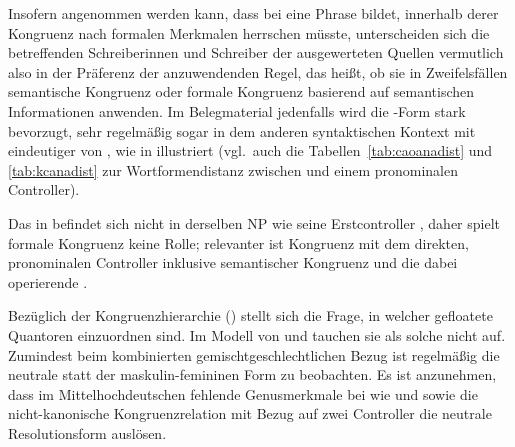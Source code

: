 Insofern angenommen werden kann, dass  bei 
eine Phrase bildet, innerhalb derer Kongruenz nach formalen
Merkmalen herrschen müsste, unterscheiden sich die
betreffenden Schreiberinnen und Schreiber der ausgewerteten Quellen vermutlich
also in der Präferenz der anzuwendenden Regel, das heißt, ob sie in
Zweifelsfällen semantische Kongruenz oder formale
Kongruenz basierend auf semantischen Informationen anwenden. Im Belegmaterial
jedenfalls wird die -Form stark bevorzugt, sehr regelmäßig sogar in
dem anderen syntaktischen Kontext mit eindeutiger  von
, wie in 
illustriert (vgl.~auch die Tabellen~\ref{tab:caoanadist} und
\ref{tab:kcanadist} zur Wortformendistanz zwischen
 und einem pronominalen Controller).

\begin{exe}
\end{exe}

Das   in  befindet sich
nicht in derselben NP wie seine Erstcontroller  , daher spielt formale
Kongruenz keine Rolle; relevanter ist Kongruenz mit dem
direkten, pronominalen Controller   inklusive semantischer
Kongruenz und die dabei operierende
.

Bezüglich der Kongruenzhierarchie
() stellt sich die Frage, in welcher 
gefloatete Quantoren einzuordnen sind. Im Modell von
\citet{corbett1979} und \citet[84]{wechslerzlatic2003} tauchen sie als solche
nicht auf. Zumindest beim kombinierten gemischtgeschlechtlichen Bezug ist
regelmäßig die neutrale statt der maskulin-\allowbreak{}femi\-ninen Form zu
beobachten. Es ist anzunehmen, dass im
Mittelhochdeutschen fehlende
Genusmerkmale bei  wie  und
 sowie die nicht-kanonische
Kongruenzrelation mit Bezug auf zwei
Controller die neutrale Resolutionsform auslösen.

